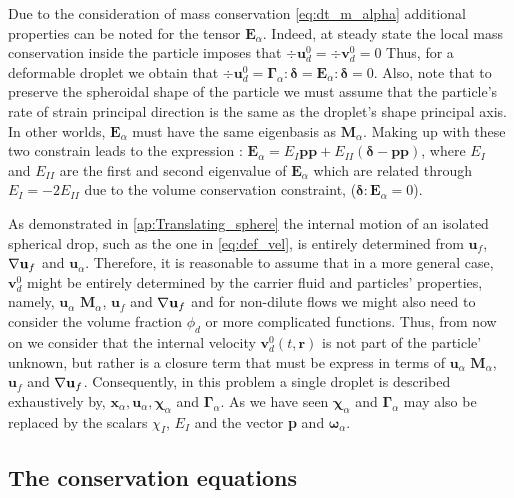 Due to the consideration of mass conservation \eqref{eq:dt_m_alpha} additional properties can be noted for the tensor $\textbf{E}_\alpha$.
Indeed, at steady state the local mass conservation inside the particle imposes that $\div \textbf{u}_d^0 =\div \textbf{v}_d^0 = 0$ 
Thus, for a deformable droplet we obtain that $\div \textbf{u}_d^0 = \bm\Gamma_\alpha : \bm\delta = \textbf{E}_\alpha : \bm\delta =  0$.  
Also, note that to preserve the spheroidal shape of the particle we must assume that the particle's rate of strain principal direction is the same as the droplet's shape principal axis. 
In other worlds, $\textbf{E}_\alpha$ must have the same eigenbasis as $\textbf{M}_\alpha$. 
Making up with these two constrain leads to the expression : $\textbf{E}_\alpha = E_I \textbf{pp} + E_{II} (\bm\delta - \textbf{pp})$, where $E_I$ and $E_{II}$ are the first and second eigenvalue of $\textbf{E}_\alpha$ which are related through $E_I = - 2E_{II}$ due to the volume conservation constraint, ($\bm\delta : \textbf{E}_\alpha =0$). 


As demonstrated in \ref{ap:Translating_sphere} the internal motion of an isolated spherical drop, such as the one in \ref{eq:def_vel}, is entirely determined  from $\textbf{u}_f$,$\mathbf{\nabla}\textbf{u}_f$ and $\textbf{u}_\alpha$. 
Therefore, it is reasonable to assume that in a more general case, $\textbf{v}_d^0$ might be entirely determined by the carrier fluid and particles' properties, namely, $\textbf{u}_\alpha$ $\textbf{M}_\alpha$, $\textbf{u}_f$ and $\mathbf{\nabla}\textbf{u}_f$ and for non-dilute flows we might also need to consider the volume fraction $\phi_d$ or more complicated functions. 
Thus, from now on we consider that the internal velocity $\textbf{v}^0_d(t,\textbf{r})$ is not part of the particle' unknown, but rather is a closure term that must be express in terms of $\textbf{u}_\alpha$ $\textbf{M}_\alpha$, $\textbf{u}_f$ and $\mathbf{\nabla}\textbf{u}_f$. 
Consequently, in this problem a single droplet is described exhaustively by, $\textbf{x}_\alpha, \textbf{u}_\alpha, \bm\chi_\alpha$ and $\bm\Gamma_\alpha$.
As we have seen $\bm\chi_\alpha$ and $\bm\Gamma_\alpha$ may also be replaced by the scalars $\chi_I$, $E_I$ and the vector \textbf{p} and $\bm\omega_\alpha$. 

\subsection{The conservation equations}

